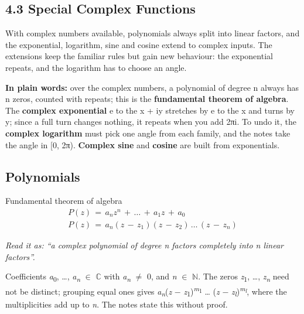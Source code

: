 \documentclass[11pt]{article}
\begin{document}
\begin{keepsection}
\section{4.3 Special Complex Functions}

With complex numbers available, polynomials always split into linear factors, and the exponential, logarithm, sine and cosine extend to complex inputs. The extensions keep the familiar rules but gain new behaviour: the exponential repeats, and the logarithm has to choose an angle.

\begin{plainbox}\textbf{In plain words:} over the complex numbers, a polynomial of degree n always has n zeros, counted with repeats; this is the \textbf{fundamental theorem of algebra}. The \textbf{complex exponential} e to the x + iy stretches by e to the x and turns by y; since a full turn changes nothing, it repeats when you add 2πi. To undo it, the \textbf{complex logarithm} must pick one angle from each family, and the notes take the angle in [0, 2π). \textbf{Complex sine} and \textbf{cosine} are built from exponentials.\end{plainbox}

\begin{keepsection}
\subsection{Polynomials}

\begin{equationcard}{Fundamental theorem of algebra}
\[ \begin{gathered} {P}({z})\, =\, {a}_{{n}}{z}^{{n}}\, +\, …\, +\, {a}_{1}{z}\, +\, {a}_{0} \\ {P}({z})\, =\, {a}_{{n}}({z}\, -\, {z}_{1})({z}\, -\, {z}_{2})\, …\, ({z}\, -\, {z}_{{n}}) \end{gathered} \]
{\small \emph{Read it as: “a complex polynomial of degree n factors completely into n linear factors”.}\par Coefficients \textit{a}\textsubscript{0}, …, \textit{a}\textsubscript{\textit{n}} \ensuremath{\in} \ensuremath{\mathbb{C}} with \textit{a}\textsubscript{\textit{n}} \ensuremath{\neq} 0, and \textit{n} \ensuremath{\in} \ensuremath{\mathbb{N}}. The zeros \textit{z}\textsubscript{1}, …, \textit{z}\textsubscript{\textit{n}} need not be distinct; grouping equal ones gives \textit{a}\textsubscript{\textit{n}}(\textit{z} \ensuremath{-} \textit{z}\textsubscript{1})\textsuperscript{\textit{m}\textsubscript{1}} … (\textit{z} \ensuremath{-} \textit{z}\textsubscript{\textit{l}})\textsuperscript{\textit{m}\textsubscript{\textit{l}}}, where the multiplicities add up to \textit{n}. The notes state this without proof.}
\end{equationcard}


\end{keepsection}
\end{keepsection}
\end{document}
